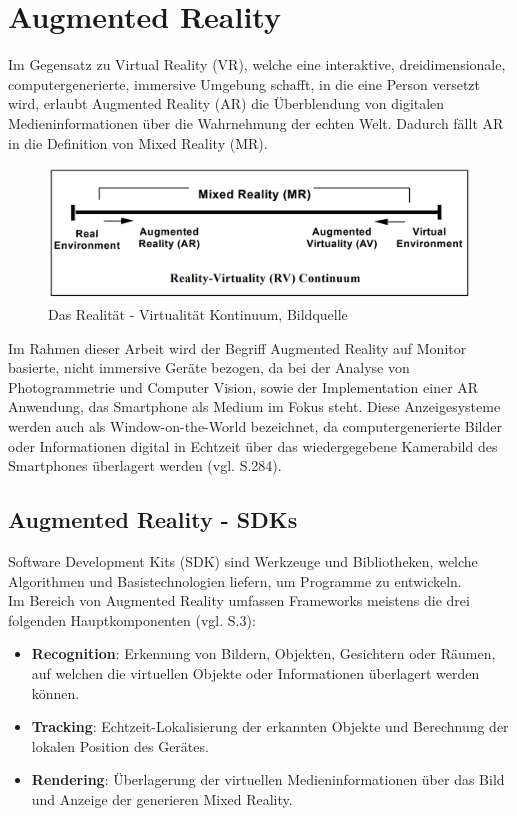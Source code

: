 \chapter{Augmented Reality}

Im Gegensatz zu \glqq Virtual Reality\grqq{} (VR), welche eine interaktive, dreidimensionale, computergenerierte, immersive Umgebung schafft, in die eine Person versetzt wird, erlaubt \glqq Augmented Reality\grqq{} (AR) die Überblendung von digitalen Medieninformationen über die Wahrnehmung der echten Welt. Dadurch fällt AR in die Definition von \glqq Mixed Reality\grqq{} (MR).

\begin{figure}[H]
	\centering
	\includegraphics[scale=0.5]{ar_vr.png}
	\caption{Das Realität - Virtualität Kontinuum, Bildquelle \cite{ar_vr}}
\end{figure} 

Im Rahmen dieser Arbeit wird der Begriff Augmented Reality auf Monitor basierte, nicht immersive Geräte bezogen, da bei der Analyse von Photogrammetrie und Computer Vision, sowie der Implementation einer AR Anwendung, das Smartphone als Medium im Fokus steht. Diese Anzeigesysteme werden auch als \glqq Window-on-the-World\grqq{} bezeichnet, da computergenerierte Bilder oder Informationen digital in Echtzeit über das wiedergegebene Kamerabild des Smartphones überlagert werden (vgl. \cite{ar_vr} S.284).



\section{Augmented Reality - SDKs}

\glqq Software Development Kits\grqq{} (SDK) sind Werkzeuge und Bibliotheken, welche Algorithmen und Basistechnologien liefern, um Programme zu entwickeln. \\ Im Bereich von Augmented Reality umfassen Frameworks meistens die drei folgenden Hauptkomponenten (vgl. \cite{sdks} S.3):

\begin{itemize}

\item \textbf{Recognition}: Erkennung von Bildern, Objekten, Gesichtern oder Räumen, auf welchen die virtuellen Objekte oder Informationen überlagert werden können.


\item \textbf{Tracking}: Echtzeit-Lokalisierung der erkannten Objekte und Berechnung der lokalen Position des Gerätes.

\item \textbf{Rendering}: Überlagerung der virtuellen Medieninformationen über das Bild und Anzeige der generieren Mixed Reality.
\end{itemize}

